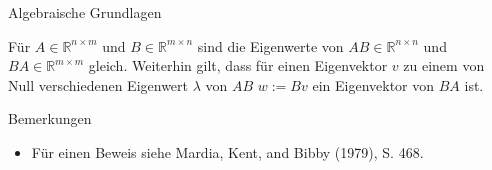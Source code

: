 \documentclass[
  8pt,
  ignorenonframetext,
]{beamer}
\providecommand{\tightlist}{%
  \setlength{\itemsep}{0pt}\setlength{\parskip}{0pt}}
\begin{document}
\begin{frame}[fragile]{Algebraische Grundlagen}
\protect\hypertarget{algebraische-grundlagen-1}{}
\footnotesize
\begin{theorem}
\justifying
\normalfont
Für $A \in \mathbb{R}^{n \times m}$ und $B \in \mathbb{R}^{m \times n}$ sind
die Eigenwerte von $AB \in \mathbb{R}^{n \times n}$ und $BA \in \mathbb{R}^{m \times m}$
gleich. Weiterhin gilt, dass für einen Eigenvektor $v$ zu einem von Null
verschiedenen Eigenwert $\lambda$ von $AB$ $w := Bv$ ein Eigenvektor von $BA$ ist.
\end{theorem}

Bemerkungen

\begin{itemize}
\tightlist
\item
  Für einen Beweis siehe Mardia, Kent, and Bibby (1979), S. 468.
\end{itemize}

\vspace{1mm}
\tiny
{}


\end{frame}
\end{document}
